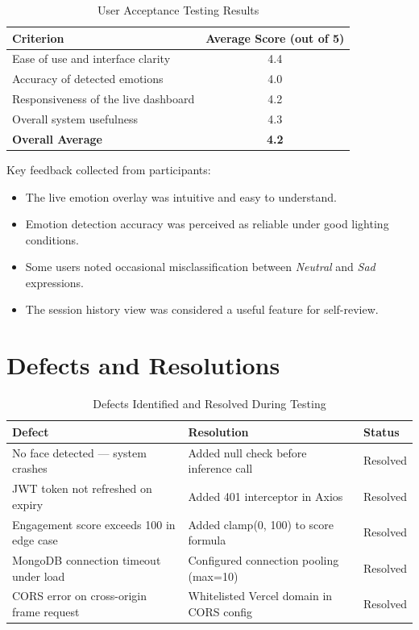 \begin{table}[H]
\centering
\caption{User Acceptance Testing Results}
\begin{tabular}{lc}
\toprule
\textbf{Criterion}                        & \textbf{Average Score (out of 5)} \\
\midrule
Ease of use and interface clarity         & 4.4 \\
Accuracy of detected emotions             & 4.0 \\
Responsiveness of the live dashboard      & 4.2 \\
Overall system usefulness                 & 4.3 \\
\midrule
\textbf{Overall Average}                  & \textbf{4.2} \\
\bottomrule
\end{tabular}
\end{table}

Key feedback collected from participants:
\begin{itemize}
    \item The live emotion overlay was intuitive and easy to understand.
    \item Emotion detection accuracy was perceived as reliable under
          good lighting conditions.
    \item Some users noted occasional misclassification between
          \textit{Neutral} and \textit{Sad} expressions.
    \item The session history view was considered a useful feature for
          self-review.
\end{itemize}

\section{Defects and Resolutions}

\begin{table}[H]
\centering
\caption{Defects Identified and Resolved During Testing}
\begin{tabular}{p{4cm} p{4cm} l}
\toprule
\textbf{Defect}                            & \textbf{Resolution}                        & \textbf{Status} \\
\midrule
No face detected — system crashes          & Added null check before inference call     & Resolved \\
JWT token not refreshed on expiry          & Added 401 interceptor in Axios             & Resolved \\
Engagement score exceeds 100 in edge case  & Added clamp(0, 100) to score formula       & Resolved \\
MongoDB connection timeout under load      & Configured connection pooling (max=10)     & Resolved \\
CORS error on cross-origin frame request   & Whitelisted Vercel domain in CORS config   & Resolved \\
\bottomrule
\end{tabular}
\end{table}
